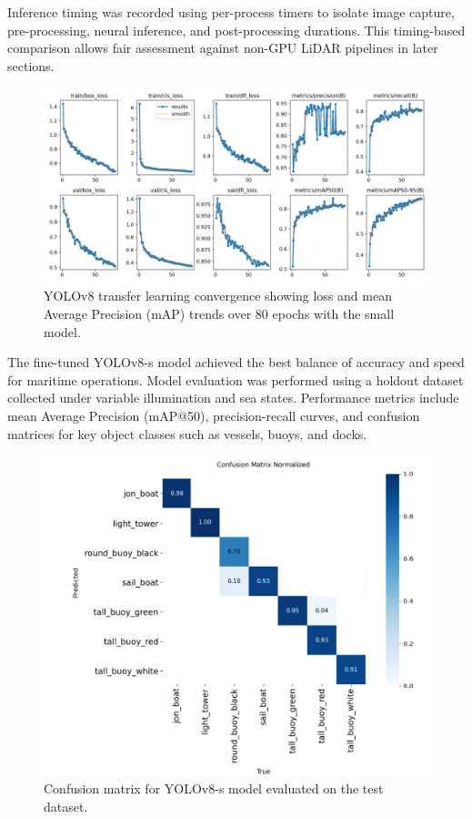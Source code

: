 \documentclass[../main.tex]{subfiles}
\begin{document}
Inference timing was recorded using per-process timers to isolate image capture, pre-processing, neural inference, and post-processing durations.
This timing-based comparison allows fair assessment against non-GPU LiDAR pipelines in later sections.

\begin{figure}[htbp]
    \centering
    \includegraphics[width=0.85\linewidth]{Images/yolo/YOLO_training.png}
    \caption{YOLOv8 transfer learning convergence showing loss and mean Average Precision (mAP) trends over 80 epochs with the small model.}
    \label{fig:yolo_training_curve}
\end{figure}





The fine-tuned YOLOv8-s model achieved the best balance of accuracy and speed for maritime operations.
Model evaluation was performed using a holdout dataset collected under variable illumination and sea states.
Performance metrics include mean Average Precision (mAP@50), precision-recall curves, and confusion matrices for key object classes such as vessels, buoys, and docks.

\begin{figure}[htbp]
    \centering
    \includegraphics[width=0.8\linewidth]{Images/yolo/YOLO_training_results.png}
    \caption{Confusion matrix for YOLOv8-s model evaluated on the test dataset.}
    \label{fig:yolo_confusion_matrix}
\end{figure}
\end{document}
